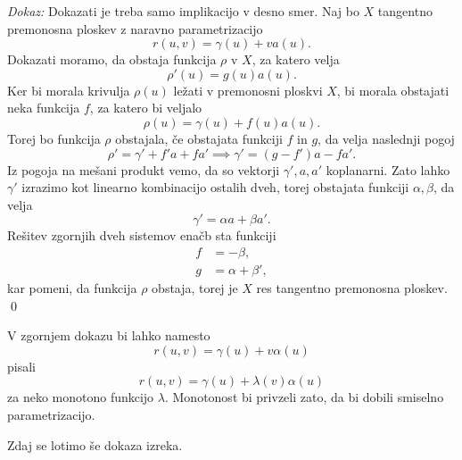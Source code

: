 \noindent
{\em Dokaz:\/}
Dokazati je treba samo implikacijo v desno smer. Naj bo $X$ tangentno premonosna ploskev z naravno parametrizacijo \begin{equation*}
r(u,v) = \gamma(u) + v a(u).
\end{equation*}  
Dokazati moramo, da obstaja funkcija $\rho$ v $X$, za katero velja \begin{equation*}
\rho'(u) = g(u) a(u).
\end{equation*}  
Ker bi morala krivulja $\rho(u)$ ležati v premonosni ploskvi $X$, bi morala obstajati neka funkcija $f$, za katero bi veljalo
\begin{equation*}
\rho(u) = \gamma(u) + f(u)a(u).
\end{equation*}  
Torej bo funkcija $\rho$ obstajala, če obstajata funkciji $f$ in $g$, da velja naslednji pogoj \begin{equation*}
\rho' = \gamma' + f'a + f a' \implies \gamma' = (g - f') a - fa'.
\end{equation*}  
Iz pogoja na mešani produkt vemo, da so vektorji $\gamma', a, a'$ koplanarni. Zato lahko $\gamma'$ izrazimo kot linearno kombinacijo ostalih dveh, torej
obstajata funkciji $\alpha, \beta$, da velja
\begin{equation*}
\gamma' = \alpha a + \beta a'.
\end{equation*}  
Rešitev zgornjih dveh sistemov enačb sta funkciji \begin{align*}
    f &= -\beta, \\
    g &= \alpha + \beta', 
\end{align*}
kar pomeni, da funkcija $\rho$ obstaja, torej je $X$ res tangentno premonosna ploskev.
\qed

\begin{opomba}
V zgornjem dokazu bi lahko namesto \begin{equation*} r(u,v) = \gamma(u) + v \alpha(u) \end{equation*} pisali 
\begin{equation*} r(u,v) = \gamma(u) + \lambda(v) \alpha(u) \end{equation*} za neko monotono funkcijo $\lambda$.
Monotonost bi privzeli zato, da bi dobili smiselno parametrizacijo.
\end{opomba}

Zdaj se lotimo še dokaza izreka.

